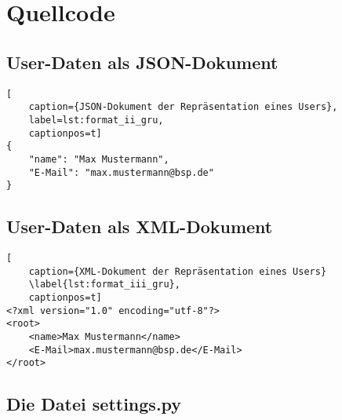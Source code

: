 \chapter{Quellcode}
\label{quellcode}

\section{User-Daten als JSON-Dokument}
\label{format_ii_gru}

\begin{lstlisting}[
    caption={JSON-Dokument der Repräsentation eines Users},
    label=lst:format_ii_gru,
    captionpos=t]
{
    "name": "Max Mustermann",
    "E-Mail": "max.mustermann@bsp.de"
}
\end{lstlisting}

\section{User-Daten als XML-Dokument}
\label{format_iii_gru}

\begin{lstlisting}[
    caption={XML-Dokument der Repräsentation eines Users}
    \label{lst:format_iii_gru},
    captionpos=t]
<?xml version="1.0" encoding="utf-8"?>
<root>
    <name>Max Mustermann</name>
    <E-Mail>max.mustermann@bsp.de</E-Mail>
</root>
\end{lstlisting}

\section{Die Datei settings.py}
\label{settings}

